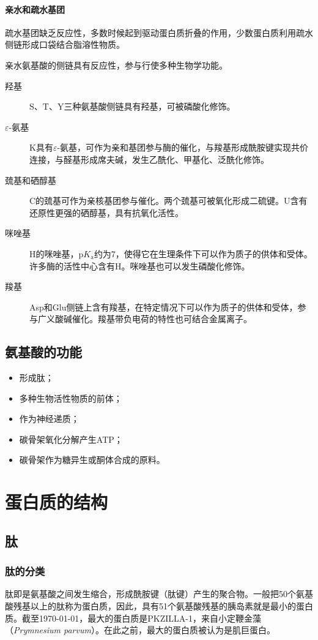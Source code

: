 \paragraph{亲水和疏水基团}

疏水基团缺乏反应性，多数时候起到驱动蛋白质折叠的作用，少数蛋白质利用疏水侧链形成口袋结合脂溶性物质。

亲水氨基酸的侧链具有反应性，参与行使多种生物学功能。
\begin{description}
	\item[羟基] S、T、Y三种氨基酸侧链具有羟基，可被磷酸化修饰。
	\item[$\varepsilon$-氨基] K具有$\varepsilon$-氨基，可作为亲和基团参与酶的催化，与羧基形成酰胺键实现共价连接，与醛基形成席夫碱，发生乙酰化、甲基化、泛酰化修饰。
	\item[巯基和硒醇基] C的巯基可作为亲核基团参与催化。两个巯基可被氧化形成二硫键。U含有还原性更强的硒醇基，具有抗氧化活性。
	\item[咪唑基] H的咪唑基，$\mathrm{p}K_{\text{a}}$约为7，使得它在生理条件下可以作为质子的供体和受体。许多酶的活性中心含有H。咪唑基也可以发生磷酸化修饰。
	\item[羧基] Asp和Glu侧链上含有羧基，在特定情况下可以作为质子的供体和受体，参与广义酸碱催化。羧基带负电荷的特性也可结合金属离子。
\end{description}

\subsection{氨基酸的功能}

\begin{itemize}
	\item 形成肽；
	\item 多种生物活性物质的前体；
	\item 作为神经递质；
	\item 碳骨架氧化分解产生ATP；
	\item 碳骨架作为糖异生或酮体合成的原料。
\end{itemize}

\section{蛋白质的结构}

\subsection{肽}

\subsubsection{肽的分类}
肽即是氨基酸之间发生缩合，形成酰胺键（肽键）产生的聚合物。一般把50个氨基酸残基以上的肽称为蛋白质，因此，具有51个氨基酸残基的胰岛素就是最小的蛋白质。截至\today，最大的蛋白质是PKZILLA-1，来自小定鞭金藻（\textit{Prymnesium parvum}）。在此之前，最大的蛋白质被认为是肌巨蛋白。

